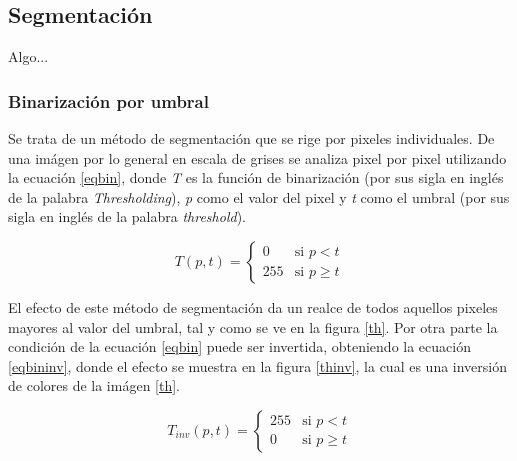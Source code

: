 \documentclass[twoside,spanish,ESP,MSc]{plantillaLabUPV}
\theoremstyle{definition}
\begin{document}
\subsection{Segmentación}
Algo...

\subsubsection{Binarización por umbral}
Se trata de un método de segmentación que se rige por pixeles individuales. De una imágen por lo general en escala de grises se analiza pixel por pixel utilizando la ecuación \ref{eqbin}, donde \textit{T} es la función de binarización (por sus sigla en inglés de la palabra \textit{Thresholding}), \textit{p} como el valor del pixel y \textit{t} como el umbral (por sus sigla en inglés de la palabra \textit{threshold}).

\begin{equation}\label{eqbin}
{ T(p,t) = \left \{ \begin{matrix} 0 & \mbox{si }p<t
\\ 255 & \mbox{si } p \geq t\end{matrix}\right. }
\end{equation}

El efecto de este método de segmentación da un realce de todos aquellos pixeles mayores al valor del umbral, tal y como se ve en la figura \ref{th}. Por otra parte la condición de la ecuación \ref{eqbin} puede ser invertida, obteniendo la ecuación \ref{eqbininv}, donde el efecto se muestra en la figura \ref{thinv}, la cual es una inversión de colores de la imágen \ref{th}. 

\begin{equation}\label{eqbininv}
{ T_{inv}(p,t) = \left \{ \begin{matrix} 255 & \mbox{si }p<t
\\ 0 & \mbox{si } p \geq t\end{matrix}\right. }
\end{equation}
\end{document}
